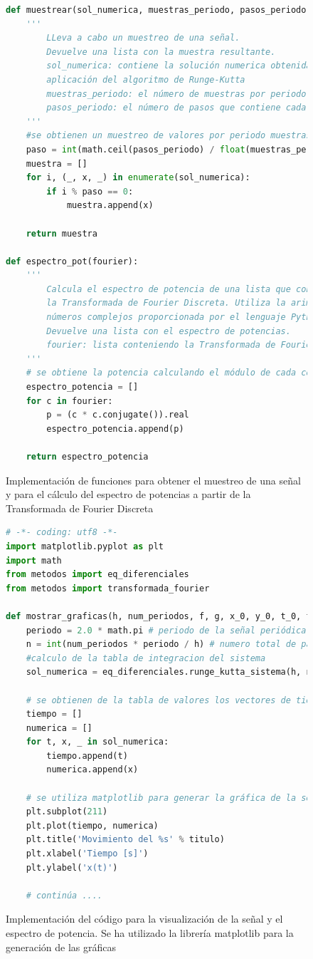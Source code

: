 \documentclass[11pt]{article}
\begin{document}
\begin{figure}
\begin{lstlisting}[language=Python]
def muestrear(sol_numerica, muestras_periodo, pasos_periodo):
	'''
		LLeva a cabo un muestreo de una señal.
		Devuelve una lista con la muestra resultante.
		sol_numerica: contiene la solución numerica obtenida de la
		aplicación del algoritmo de Runge-Kutta
		muestras_periodo: el número de muestras por periodo a obtener
		pasos_periodo: el número de pasos que contiene cada perido
	'''
	#se obtienen un muestreo de valores por periodo muestras_periodo
	paso = int(math.ceil(pasos_periodo) / float(muestras_periodo - 1))
	muestra = []
	for i, (_, x, _) in enumerate(sol_numerica):
		if i % paso == 0:
			muestra.append(x)

	return muestra

def espectro_pot(fourier):
	'''
		Calcula el espectro de potencia de una lista que contiene
		la Transformada de Fourier Discreta. Utiliza la arimética de
		números complejos proporcionada por el lenguaje Python.
		Devuelve una lista con el espectro de potencias.
		fourier: lista conteniendo la Transformada de Fourier Discreta.
	'''
	# se obtiene la potencia calculando el módulo de cada coeficiente complejo
	espectro_potencia = []
	for c in fourier:
		p = (c * c.conjugate()).real
		espectro_potencia.append(p)

	return espectro_potencia
\end{lstlisting}
\caption{Implementación de funciones para obtener el muestreo de una señal y para el cálculo del espectro de
potencias a partir de la Transformada de Fourier Discreta}
\end{figure}

\begin{figure}
\begin{lstlisting}[language=python]
# -*- coding: utf8 -*-
import matplotlib.pyplot as plt
import math
from metodos import eq_diferenciales
from metodos import transformada_fourier

def mostrar_graficas(h, num_periodos, f, g, x_0, y_0, t_0, titulo, fichero=None):
	periodo = 2.0 * math.pi # periodo de la señal periódica
	n = int(num_periodos * periodo / h) # numero total de pasos de integración
	#calculo de la tabla de integracion del sistema 
	sol_numerica = eq_diferenciales.runge_kutta_sistema(h, n, f, g, x_0, y_0, t_0)

	# se obtienen de la tabla de valores los vectores de tiempo, 
	tiempo = []
	numerica = []
	for t, x, _ in sol_numerica:
		tiempo.append(t)
		numerica.append(x)

	# se utiliza matplotlib para generar la gráfica de la señal
	plt.subplot(211)
	plt.plot(tiempo, numerica)
	plt.title('Movimiento del %s' % titulo)
	plt.xlabel('Tiempo [s]')
	plt.ylabel('x(t)')

	# continúa ....

\end{lstlisting}
\caption{Implementación del código para la visualización de la señal y el espectro de potencia.
Se ha utilizado la librería matplotlib para la generación de las gráficas}
\label{codigo_graficas_1}
\end{figure}
\end{document}
